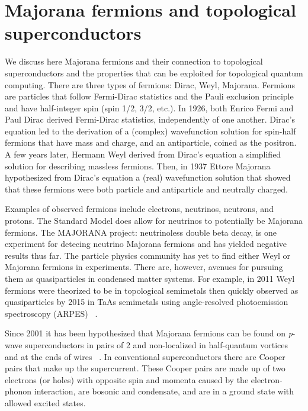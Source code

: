 \section{Majorana fermions and topological superconductors}

We discuss here Majorana fermions and their connection to topological superconductors and the properties that can be exploited for topological quantum computing.
There are three types of fermions: Dirac, Weyl, Majorana.
Fermions are particles that follow Fermi-Dirac statistics and the Pauli exclusion principle and have half-integer spin (spin 1/2, 3/2, etc.).
In 1926, both Enrico Fermi and Paul Dirac derived Fermi-Dirac statistics, independently of one another.
Dirac's equation led to the derivation of a (complex) wavefunction solution for spin-half fermions that have mass and charge, and an antiparticle, coined as the positron.
A few years later, Hermann Weyl derived from Dirac's equation a simplified solution for describing massless fermions.
Then, in 1937 Ettore Majorana hypothesized from Dirac's equation a (real) wavefunction solution that showed that these fermions were both particle and antiparticle and neutrally charged.

Examples of observed fermions include electrons, neutrinos, neutrons, and protons.
The Standard Model does allow for neutrinos to potentially be Majorana fermions.
The MAJORANA project: neutrinoless double beta decay, is one experiment for detecing neutrino Majorana fermions and has yielded negative results thus far.
The particle physics community has yet to find either Weyl or Majorana fermions in experiments.
There are, however, avenues for pursuing them as quasiparticles in condensed matter systems.
For example, in 2011 Weyl fermions were theorized to be in topological semimetals then quickly observed as quasiparticles by 2015 in TaAs semimetals using angle-resolved photoemission spectroscopy (ARPES)  ~\cite{wanTopologicalSemimetalFermiarc2011, xuDiscoveryWeylFermion2015, liWeylSemimetalTaAs2016}.

Since 2001 it has been hypothesized that Majorana fermions can be found on \textit{p}-wave superconductors in pairs of 2 and non-localized in half-quantum vortices and at the ends of wires  ~\cite{ivanovNonAbelianStatisticsHalfQuantum2001, kitaevUnpairedMajoranaFermions2001}.
In conventional superconductors there are Cooper pairs that make up the supercurrent.
These Cooper pairs are made up of two electrons (or holes) with opposite spin and momenta caused by the electron-phonon interaction, are bosonic and condensate, and are in a ground state with allowed excited states.

